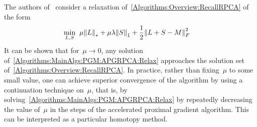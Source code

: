 The authors of~\cite{Lin:2009kx} consider a relaxation of~\eqref{Algorithms:Overview:RecallRPCA} of the form
%
\begin{align}
\min_{L,S} \;\; &\mu {\left\|L\right\|}_{*}^{} + \mu \lambda {\left\|S\right\|}_{1}^{} + \frac{1}{2} {\left\|L+S-M\right\|}_{F}^{2} 
\label{Algorithms:MainAlgs:PGM:APGRPCA:Relax}
\end{align}
%
It can be shown that for~$\mu \rightarrow 0$, any solution of~\eqref{Algorithms:MainAlgs:PGM:APGRPCA:Relax} approaches the solution set of~\eqref{Algorithms:Overview:RecallRPCA}. In practice, rather than fixing~$\mu$ to some small value, one can achieve superior convergence of the algorithm by using a continuation technique on~$\mu$, that is, by solving~\eqref{Algorithms:MainAlgs:PGM:APGRPCA:Relax} by repeatedly decreasing the value of~$\mu$ in the steps of the accelerated proximal gradient algorithm. This can be interpreted as a particular homotopy method. 

